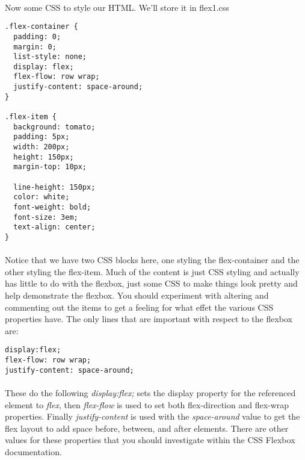 \documentclass[10pt, a4paper, twosize]{article}
\begin{document}
\paragraph{} Now some CSS to style our HTML. We'll store it in flex1.css
\begin{lstlisting}
.flex-container {
  padding: 0;
  margin: 0;
  list-style: none;
  display: flex;
  flex-flow: row wrap;
  justify-content: space-around;
}

.flex-item {
  background: tomato;
  padding: 5px;
  width: 200px;
  height: 150px;
  margin-top: 10px;
  
  line-height: 150px;
  color: white;
  font-weight: bold;
  font-size: 3em;
  text-align: center;
}
\end{lstlisting}
\paragraph{} Notice that we have two CSS blocks here, one styling the flex-container and the other styling the flex-item. Much of the content is just CSS styling and actually has little to do with the flexbox, just some CSS to make things look pretty and help demonstrate the flexbox. You should experiment with altering and commenting out the items to get a feeling for what effet the various CSS properties have. The only lines that are important with respect to the flexbox are:

\begin{lstlisting}
display:flex;  
flex-flow: row wrap;
justify-content: space-around;
\end{lstlisting}
\paragraph{} These do the following \emph{display:flex;} sets the display property for the referenced element to \emph{flex}, then \emph{flex-flow} is used to set both flex-direction and flex-wrap properties. Finally \emph{justify-content} is used with the \emph{space-around} value to get the flex layout to add space before, between, and after elements. There are other values for these properties that you should investigate within the CSS Flexbox documentation.
\end{document}
